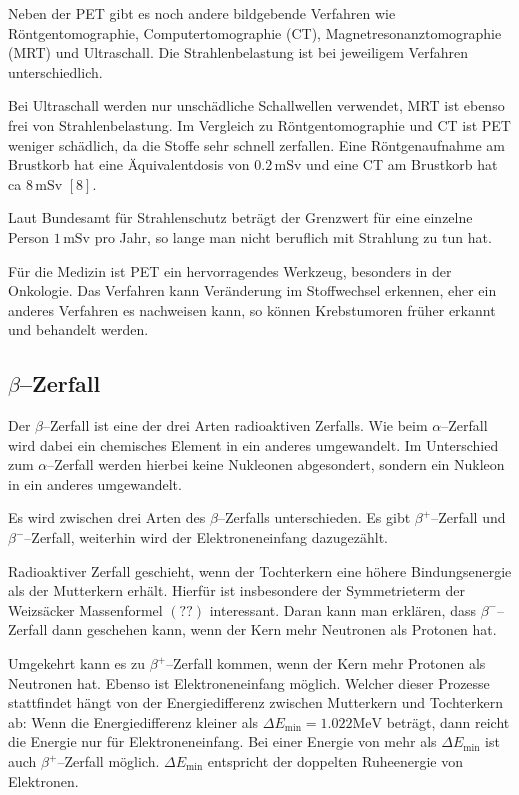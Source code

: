 \documentclass[12pt,a4paper]{scrartcl}
\numberwithin{equation}{section} %
\newcommand{\pu}[1]{\ensuremath{\mathrm{#1}}}
\begin{document}
Neben der PET gibt es noch andere bildgebende Verfahren wie Röntgentomographie, Computertomographie (CT), Magnetresonanztomographie (MRT) und Ultraschall. Die Strahlenbelastung ist bei jeweiligem Verfahren unterschiedlich.

Bei Ultraschall werden nur unschädliche Schallwellen verwendet, MRT ist ebenso frei von Strahlenbelastung. Im Vergleich zu Röntgentomographie und CT ist PET weniger schädlich, da die Stoffe sehr schnell zerfallen. Eine Röntgenaufnahme am Brustkorb hat eine Äquivalentdosis von $\pu{0.2 \,mSv}$ und eine CT am Brustkorb hat ca $\pu{8 \,mSv}$ $[8]$.

Laut Bundesamt für Strahlenschutz beträgt der Grenzwert für eine einzelne Person $\pu{1 \,mSv}$ pro Jahr, so lange man nicht beruflich mit Strahlung zu tun hat.

Für die Medizin ist PET ein hervorragendes Werkzeug, besonders in der Onkologie. Das Verfahren kann Veränderung im Stoffwechsel erkennen, eher ein anderes Verfahren es nachweisen kann, so können Krebstumoren früher erkannt und behandelt werden.

\hypertarget{betazerfall}{%
\subsection{\texorpdfstring{$\beta$--Zerfall}{\textbackslash beta--Zerfall}}\label{betazerfall}}

Der $\beta$--Zerfall ist eine der drei Arten radioaktiven Zerfalls. Wie beim $\alpha$--Zerfall wird dabei ein chemisches Element in ein anderes umgewandelt. Im Unterschied zum $\alpha$--Zerfall werden hierbei keine Nukleonen abgesondert, sondern ein Nukleon in ein anderes umgewandelt.

Es wird zwischen drei Arten des $\beta$--Zerfalls unterschieden. Es gibt $\beta^+$--Zerfall und $\beta^-$--Zerfall, weiterhin wird der Elektroneneinfang dazugezählt.

Radioaktiver Zerfall geschieht, wenn der Tochterkern eine höhere Bindungsenergie als der Mutterkern erhält. Hierfür ist insbesondere der Symmetrieterm der Weizsäcker Massenformel $(??)$ interessant. Daran kann man erklären, dass $\beta^-$--Zerfall dann geschehen kann, wenn der Kern mehr Neutronen als Protonen hat.

Umgekehrt kann es zu $\beta^+$--Zerfall kommen, wenn der Kern mehr Protonen als Neutronen hat. Ebenso ist Elektroneneinfang möglich. Welcher dieser Prozesse stattfindet hängt von der Energiedifferenz zwischen Mutterkern und Tochterkern ab: Wenn die Energiedifferenz kleiner als $\Delta E_\mathrm{min}=\pu{1.022 MeV}$ beträgt, dann reicht die Energie nur für Elektroneneinfang. Bei einer Energie von mehr als $\Delta E_\mathrm{min}$ ist auch $\beta^+$--Zerfall möglich. $\Delta E_\mathrm{min}$ entspricht der doppelten Ruheenergie von Elektronen.
\end{document}
